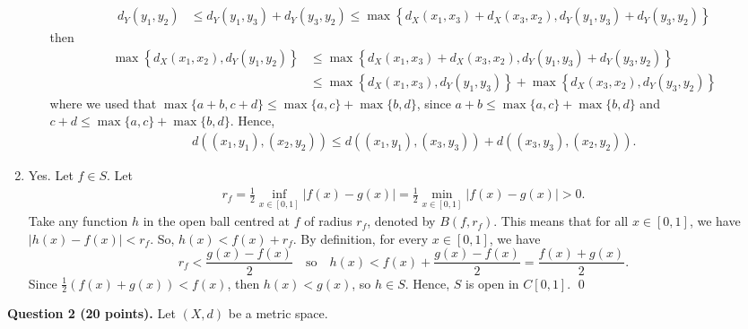 \documentclass[11pt]{amsart}
\theoremstyle{plain}
\numberwithin{equation}{section}
\begin{document}
\begin{enumerate}[label=\textbf{(\alph*)}]
\begin{itemize}
\begin{align*}
        \\
        d_{Y}\left(y_{1},y_{2}\right)&\leq d_{Y}\left(y_{1},y_{3}\right)+d_{Y}\left(y_{3},y_{2}\right)\leq\max\left\{d_{X}\left(x_{1},x_{3}\right)+d_{X}\left(x_{3},x_{2}\right),d_{Y}\left(y_{1},y_{3}\right)+d_{Y}\left(y_{3},y_{2}\right)\right\}
    \end{align*}
    then
    \begin{align*}
        \max\left\{d_{X}\left(x_{1},x_{2}\right),d_{Y}\left(y_{1},y_{2}\right)\right\}&\leq\max\left\{d_{X}\left(x_{1},x_{3}\right)+d_{X}\left(x_{3},x_{2}\right),d_{Y}\left(y_{1},y_{3}\right)+d_{Y}\left(y_{3},y_{2}\right)\right\}
        \\
        &\leq\max\left\{d_{X}\left(x_{1},x_{3}\right),d_{Y}\left(y_{1},y_{3}\right)\right\}+\max\left\{d_{X}\left(x_{3},x_{2}\right),d_{Y}\left(y_{3},y_{2}\right)\right\}
    \end{align*}
    where we used that $\max\{a+b,c+d\}\leq\max\{a,c\}+\max\{b,d\}$, since $a+b\leq\max\{a,c\}+\max\{b,d\}$ and $c+d\leq\max\{a,c\}+\max\{b,d\}$. Hence,
    \begin{align*}
        d\left(\left(x_{1},y_{1}\right),\left(x_{2},y_{2}\right)\right)\leq d\left(\left(x_{1},y_{1}\right),\left(x_{3},y_{3}\right)\right)+d\left(\left(x_{3},y_{3}\right),\left(x_{2},y_{2}\right)\right).
    \end{align*}
\end{itemize}
\item Yes. Let $f\in S$. Let 
\begin{align*}
    r_{f}=\frac{1}{2}\inf_{x\in[0,1]}\left|f(x)-g(x)\right|=\frac{1}{2}\min_{x\in[0,1]}\left|f(x)-g(x)\right|>0.
\end{align*}
Take any function $h$ in the open ball centred at $f$ of radius $r_f$, denoted by $B\left(f,r_f\right)$. This means that for all $x\in\left[0,1\right]$, we have $\left|h\left(x\right)-f\left(x\right)\right|<r_f$. So, $h\left(x\right)<f\left(x\right)+r_f$. By definition, for every $x\in \left[0,1\right]$, we have \[r_f<\frac{g\left(x\right)-f\left(x\right)}{2}\quad\text{so}\quad h\left(x\right)<f\left(x\right)+\frac{g\left(x\right)-f\left(x\right)}{2}=\frac{f\left(x\right)+g\left(x\right)}{2}.\]
Since $\frac{1}{2}\left(f\left(x\right)+g\left(x\right)\right)<f\left(x\right)$, then $h\left(x\right)<g\left(x\right)$, so $h\in S$. Hence, $S$ is open in $C\left[0,1\right]$. \qed 
\end{enumerate}
\textbf{Question 2 (20 points).} Let $(X,d)$ be a metric space. 
\end{document}
